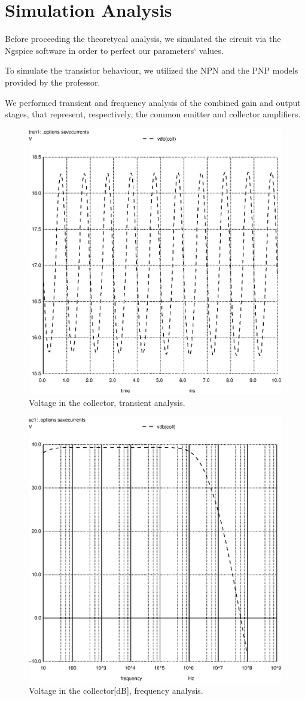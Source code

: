 \section{Simulation Analysis}
\label{sec:simulation}

Before proceeding the theoretycal analysis, we simulated the circuit via the Ngspice software in order to perfect our parameters` values.

To simulate the transistor behaviour, we utilized the NPN and the PNP models provided by the professor.

We performed transient and frequency analysis of the combined gain and output stages, that represent, respectively, the common emitter and collector amplifiers.

\begin{figure}[h] \centering
\includegraphics[width=0.6\linewidth]{vo1.eps}
\caption{Voltage in the collector, transient analysis.}
\label{fig:s1}
\end{figure}

\begin{figure}[h] \centering
\includegraphics[width=0.6\linewidth]{vo1f.eps}
\caption{Voltage in the collector[dB], frequency analysis.}
\label{fig:s2}
\end{figure}

